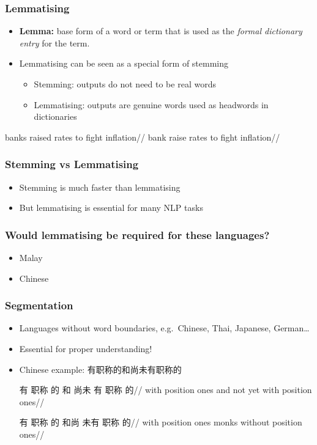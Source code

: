 \begin{frame}[allowframebreaks]
\frametitle{Lemmatising}

\begin{itemize}
\item \textbf{Lemma:} base form of a word or term that is used as the \emph{formal dictionary entry} for the term.
\item Lemmatising can be seen as a special form of stemming
	\begin{itemize}
	\item Stemming: outputs do not need to be real words
	\item Lemmatising: outputs are genuine words used as headwords in dictionaries
	\end{itemize}
\end{itemize}

\ex
\begingl
\gla {} banks raised rates to fight inflation//
\glb {} bank raise rates to fight inflation//
\endgl
\xe
\end{frame}


\begin{frame}
\frametitle{Stemming vs Lemmatising}
    
\begin{itemize}
\item Stemming is much faster than lemmatising
\item But lemmatising is essential for many NLP tasks
\end{itemize}

\end{frame}

\begin{frame}
\frametitle{Would lemmatising be required for these languages?}

\begin{itemize}
\item Malay
\item Chinese
\end{itemize}

\end{frame}


\begin{frame}
\frametitle{Segmentation}
\begin{itemize}[<+->]
\item Languages without word boundaries, e.g.~Chinese, Thai, Japanese, German\ldots
\item Essential for proper understanding!
\item Chinese example: {\xiheifont 有职称的和尚未有职称的}

\ex
\xiheifont
\begingl
\gla 有 职称 的 和 尚未 有 职称 的//
\glb with position ones and {not yet} with position ones//
\endgl
\xe

\ex
\xiheifont
\begingl
\gla 有 职称 的 \alert{和尚} 未有 职称 的//
\glb with position ones \alert{monks} without position ones//
\endgl
\xe

\end{itemize}

\end{frame}


